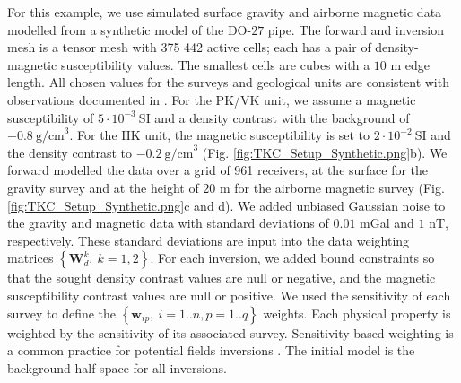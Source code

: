 \documentclass[extra, mreferee]{gji_joint} %
\begin{document}
For this example, we use simulated surface gravity and airborne magnetic data modelled from a synthetic model of the DO-$27$ pipe. The forward and inversion mesh is a tensor mesh with 375 442 active cells; each has a pair of density-magnetic susceptibility values. The smallest cells are cubes with a $10$ m edge length. All chosen values for the surveys and geological units are consistent with observations documented in \citet{TKCpaper}. For the PK/VK unit, we assume a magnetic susceptibility of $5\cdot10^{-3}~\text{SI}$ and a density contrast with the background of $-0.8~\text{g/cm}^3$. For the HK unit, the magnetic susceptibility is set to $2\cdot10^{-2}~\text{SI}$ and the density contrast to $-0.2~\text{g/cm}^3$ (Fig. \ref{fig:TKC_Setup_Synthetic.png}b). We forward modelled the data over a grid of 961 receivers, at the surface for the gravity survey and at the height of $20$ m for the airborne magnetic survey (Fig. \ref{fig:TKC_Setup_Synthetic.png}c and d). We added unbiased Gaussian noise to the gravity and magnetic data with standard deviations of $0.01$ mGal and $1$ nT, respectively. These standard deviations are input into the data weighting matrices $\left\{{\mathbf{W}_d^k, ~k=1, 2}\right\}$.
\newpage
For each inversion, we added bound constraints so that the sought density contrast values are null or negative, and the magnetic susceptibility contrast values are null or positive. We used the sensitivity of each survey to define the $\left\{\mathbf{w}_{ip}, ~i=1..n, p=1..q\right\}$ weights. Each physical property is weighted by the sensitivity of its associated survey. Sensitivity-based weighting is a common practice for potential fields inversions \citep{Li1996, Li1998, Portniaguine2002, SensW}. The initial model is the background half-space for all inversions.
\end{document}
